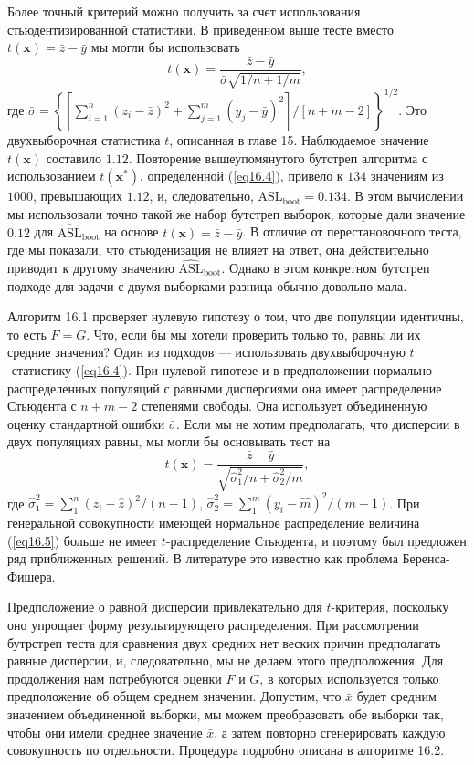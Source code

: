 Более точный критерий можно получить за счет использования стьюдентизированной статистики. В приведенном выше тесте вместо $t(\mathbf{x}) = \bar{z}-\bar{y}$ мы могли бы использовать
\begin{equation}\label{eq16.4}
    t(\mathbf{x}) = \frac{\bar{z}-\bar{y}}{\bar{\sigma}\sqrt{1/n+1/m}},
\end{equation}
где $\bar{\sigma} = \left\{\left[\sum_{i=1}^{n}(z_i-\bar{z})^2 + \sum_{j=1}^{m}(y_j-\bar{y})^2\right]/\left[n+m-2\right]\right\}^{1/2}$. Это двухвыборочная статистика $t$, описанная в главе 15. Наблюдаемое значение $t(\mathbf{x})$ составило $1.12$. Повторение вышеупомянутого бутстреп алгоритма с использованием $t(\mathbf{x}^{*})$, определенной (\ref{eq16.4}), привело к $134$ значениям из $1000$, превышающих $1.12$, и, следовательно, $\text{ASL}_{\text{boot}} = 0.134$. В этом вычислении мы использовали точно такой же набор бутстреп выборок, которые дали значение $0.12$ для $\widehat{\text{ASL}}_{\text{boot}}$ на основе $t(\mathbf{x}) = \bar{z}-\bar{y}$. В отличие от перестановочного теста, где мы показали, что стьюденизация не влияет на ответ, она действительно приводит к другому значению $\widehat{\text{ASL}}_{\text{boot}}$. Однако в этом конкретном бутстреп подходе для задачи с двумя выборками разница обычно довольно мала.

Алгоритм 16.1 проверяет нулевую гипотезу о том, что две популяции идентичны, то есть $F = G$. Что, если бы мы хотели проверить только то, равны ли их средние значения? Один из подходов --- использовать двухвыборочную $t$-статистику (\ref{eq16.4}). При нулевой гипотезе и в предположении нормально распределенных популяций с равными дисперсиями она имеет распределение Стьюдента с $n + m- 2$ степенями свободы. Она использует объединенную оценку стандартной ошибки $\bar{\sigma}$. Если мы не хотим предполагать, что дисперсии в двух популяциях равны, мы могли бы основывать тест на
\begin{equation}\label{eq16.5}
    t(\mathbf{x}) = \frac{\bar{z}-\bar{y}}{\sqrt{\hat{\sigma}^2_1/n + \hat{\sigma}^2_2/m}},
\end{equation}
где $\hat{\sigma}^2_1 = \sum_1^n(z_i-\hat{z})^2/(n-1)$, $\hat{\sigma}^2_2 = \sum_1^m(y_i-\hat{m})^2/(m-1)$. При генеральной совокупности имеющей нормальное распределение величина (\ref{eq16.5}) больше не имеет $t$-распределение Стьюдента, и поэтому был предложен ряд приближенных решений. В литературе это известно как проблема Беренса-Фишера. 

Предположение о равной дисперсии привлекательно для $t$-критерия, поскольку оно упрощает форму результирующего распределения. При рассмотрении бутрстреп теста для сравнения двух средних нет веских причин предполагать равные дисперсии, и, следовательно, мы не делаем этого предположения. Для продолжения нам потребуются оценки $F$ и $G$, в которых используется только предположение об общем среднем значении. Допустим, что $\bar{x}$ будет средним значением объединенной выборки, мы можем преобразовать обе выборки так, чтобы они имели среднее значение $\bar{x}$, а затем повторно сгенерировать каждую совокупность по отдельности. Процедура подробно описана в алгоритме 16.2. 

